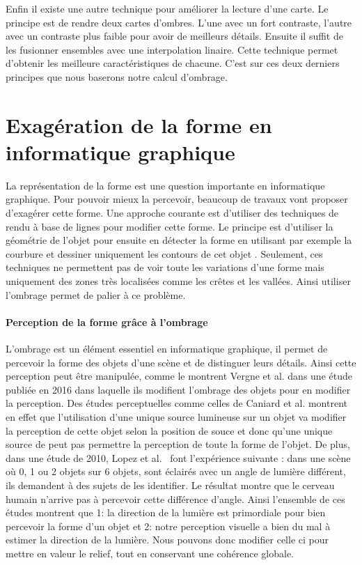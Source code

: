 Enfin il existe une autre technique pour améliorer la lecture d'une carte. Le principe est de rendre deux cartes d'ombres. L'une avec un fort contraste, l'autre avec un contraste plus faible pour avoir de meilleurs détails. Ensuite il suffit de les fusionner ensembles avec une interpolation linaire. Cette technique permet d'obtenir les meilleure caractéristiques de chacune. C'est sur ces deux derniers principes que nous baserons notre calcul d'ombrage.




\section{Exagération de la forme en informatique graphique }


La représentation de la forme est une question importante en informatique graphique. Pour pouvoir mieux la percevoir, beaucoup de travaux vont proposer d’exagérer cette forme. Une approche courante est d'utiliser des techniques de rendu à base de lignes pour modifier cette forme. Le principe est d'utiliser la géométrie de l'objet pour ensuite en détecter la forme  en utilisant par exemple la courbure \cite{ohtake2004ridge} et dessiner uniquement les contours de cet objet \cite{zhang2009laplacian}. Seulement, ces techniques ne permettent pas de voir toute les variations d'une forme mais uniquement des zones très localisées comme les crêtes et les vallées. Ainsi utiliser l'ombrage permet de palier à ce problème. 

\paragraph*{Perception de la forme grâce à l'ombrage}
L'ombrage est un élément essentiel en informatique graphique, il permet de percevoir la forme des objets d'une scène et de distinguer leurs détails. Ainsi cette perception peut être manipulée, comme le montrent Vergne et al. dans une étude publiée en 2016 \cite{vergne2016flow} dans laquelle ils modifient l'ombrage des objets pour en modifier la perception. Des études perceptuelles comme celles de Caniard et al. \cite{caniard2007distortion} montrent en effet que l'utilisation d'une unique source lumineuse sur un objet va modifier la perception de cette objet selon la position de souce et donc qu'une unique source de peut pas permettre la perception de toute la forme de l'objet. De plus, dans une étude de 2010, Lopez et al.~\cite{lopez2010measuring} font l'expérience suivante : dans une scène où 0, 1 ou 2 objets sur 6 objets, sont éclairés avec un angle de lumière différent, ils demandent à des sujets de les identifier. Le résultat montre que le cerveau humain n'arrive pas à percevoir cette différence d'angle. Ainsi l'ensemble de ces études montrent que 1: la direction de la lumière est primordiale pour bien percevoir la forme d'un objet et 2: notre perception visuelle a bien du mal à estimer la direction de la lumière. Nous pouvons donc modifier celle ci pour mettre en valeur le relief, tout en conservant une cohérence globale.


